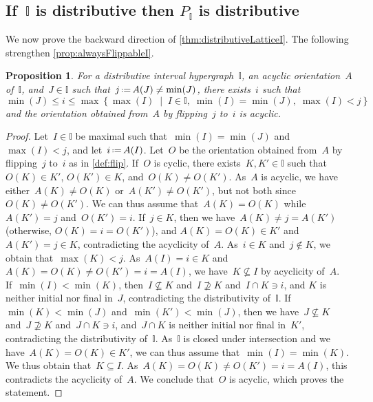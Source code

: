 \documentclass{amsart}
\newtheorem{proposition}[theorem]{Proposition}
\theoremstyle{definition}
\newcommand{\set}[2]{\left\{ #1 \;\middle|\; #2 \right\}} %
\newcommand{\eqdef}{\mbox{\,\raisebox{0.2ex}{\scriptsize\ensuremath{\mathrm:}}\ensuremath{=}\,}} %
\newcommand{\II}{\mathbb I} %
\begin{document}

\subsection{If~$\II$ is distributive then $P_\II$ is distributive}
\label{subsec:distributiveLatticeBackward}

We now prove the backward direction of \cref{thm:distributiveLatticeI}.
The following strengthen \cref{prop:alwaysFlippableI}.

\begin{proposition}
\label{prop:alwaysFlippableDistributive}
For a distributive interval hypergraph~$\II$, an acyclic orientation~$A$ of~$\II$, and~${J \in \II}$ such that~$j \eqdef A(J) \ne \min(J)$, there exists~$i$ such that
\[
\min(J) \le i \le \max\set{\max(I)}{I \in \II, \; \min(I) = \min(J), \; \max(I) < j}
\]
and the orientation obtained from~$A$ by flipping~$j$ to~$i$ is acyclic.
\end{proposition}

\begin{proof}
Let~$I \in \II$ be maximal such that~$\min(I) = \min(J)$ and~$\max(I) < j$, and let~$i \eqdef A(I)$.
Let~$O$ be the orientation obtained from~$A$ by flipping~$j$ to~$i$ as in \cref{def:flip}.
If~$O$ is cyclic, there exists~$K,K' \in \II$ such that~$O(K) \in K'$, $O(K') \in K$, and~$O(K) \ne O(K')$.
As~$A$ is acyclic, we have either~$A(K) \ne O(K)$ or~$A(K') \ne O(K')$, but not both since~$O(K) \ne O(K')$.
We can thus assume that~$A(K) = O(K)$ while $A(K') = j$ and~$O(K') = i$.
If~$j \in K$, then we have~$A(K) \ne j = A(K')$ (otherwise, $O(K) = i = O(K')$), and $A(K) = O(K) \in K'$ and~$A(K') = j \in K$, contradicting the acyclicity of~$A$.
As~$i \in K$ and~$j \notin K$, we obtain that~$\max(K) < j$.
As~$A(I) = i \in K$ and~$A(K) = O(K) \ne O(K') = i = A(I)$, we have~$K \not\subseteq I$ by acyclicity of~$A$.
If~$\min(I) < \min(K)$, then~$I \not\subseteq K$ and~$I \not\supseteq K$ and~$I \cap K \ni i$, and $K$ is neither initial nor final in~$J$, contradicting the distributivity of~$\II$.
If~$\min(K) < \min(J)$ and~$\min(K') < \min(J)$, then we have~$J \not\subseteq K$ and~$J \not\supseteq K$ and~$J \cap K \ni i$, and~$J \cap K$ is neither initial nor final in~$K'$, contradicting the distributivity of~$\II$.
As~$\II$ is closed under intersection and we have~$A(K) = O(K) \in K'$, we can thus assume that~$\min(I) = \min(K)$.
We thus obtain that~$K \subseteq I$.
As~$A(K) = O(K) \ne O(K') = i = A(I)$, this contradicts the acyclicity of~$A$.
We conclude that~$O$ is acyclic, which proves the statement.
\end{proof}
\end{document}
